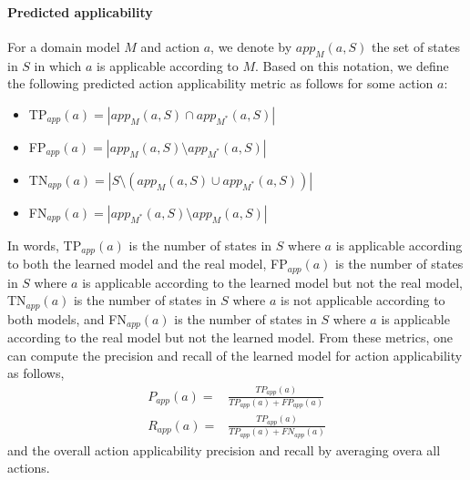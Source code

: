 \documentclass{article}
\theoremstyle{definition}
\theoremstyle{remark}
\newcommand{\realm}{\ensuremath{M^*}\xspace}
\newcommand{\app}{\ensuremath{\textit{app}}\xspace}
\begin{document}
\paragraph{Predicted applicability}
For a domain model $M$ and action $a$, we denote by $\app_M(a,S)$ the set of states in $S$ in which $a$ is applicable according to $M$. Based on this notation, we define the following predicted action applicability metric as follows for some action $a$:
\begin{itemize}
    \item TP$_{\app}(a)=|\app_M(a,S)\cap \app_\realm(a,S)|$
    \item FP$_{\app}(a)=|\app_M(a,S)\setminus \app_\realm(a,S)|$ 
    \item TN$_{\app}(a)=|S\setminus (\app_M(a,S)\cup \app_\realm(a,S))|$
    \item FN$_{\app}(a)=|\app_\realm(a,S)\setminus \app_M(a,S)|$
\end{itemize}
In words, TP$_{\app}(a)$ is the number of states in $S$ where $a$ is applicable according to both the learned model and the real model, FP$_{\app}(a)$ is the number of states in $S$ where $a$ is applicable according to the learned model but not the real model, TN$_{\app}(a)$ is the number of states in $S$ where $a$ is not applicable according to both models, and FN$_{\app}(a)$ is the number of states in $S$ where $a$ is applicable according to the real model but not the learned model. 
From these metrics, one can compute the precision and recall of the learned model for action applicability as follows,
\begin{align}
    P_{\app}(a)= & \frac{TP_{\app}(a)}{TP_{\app}(a)+FP_{\app}(a)}\\
    R_{\app}(a)= & \frac{TP_{\app}(a)}{TP_{\app}(a)+FN_{\app}(a)}    
\end{align} 
and the overall action applicability precision and recall
by averaging overa all actions.  
\end{document}
